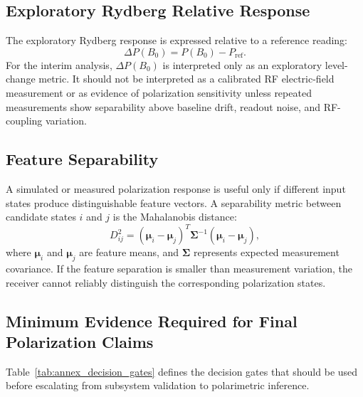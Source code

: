 \documentclass{ieeeaccess}
\begin{document}
\subsection{Exploratory Rydberg Relative Response}
\label{annex:rydberg_relative_response}

The exploratory Rydberg response is expressed relative to a reference reading:
\begin{equation}
\Delta P(B_0)
=
P(B_0)-P_{\mathrm{ref}}.
\label{eq:annex_relative_delta_p}
\end{equation}
For the interim analysis, \(\Delta P(B_0)\) is interpreted only as an exploratory level-change metric. It should not be interpreted as a calibrated RF electric-field measurement or as evidence of polarization sensitivity unless repeated measurements show separability above baseline drift, readout noise, and RF-coupling variation.

\subsection{Feature Separability}
\label{annex:feature_separability}

A simulated or measured polarization response is useful only if different input states produce distinguishable feature vectors. A separability metric between candidate states \(i\) and \(j\) is the Mahalanobis distance:
\begin{equation}
D_{ij}^{2}
=
(\boldsymbol{\mu}_{i}-\boldsymbol{\mu}_{j})^{T}
\mathbf{\Sigma}^{-1}
(\boldsymbol{\mu}_{i}-\boldsymbol{\mu}_{j}),
\label{eq:annex_mahalanobis}
\end{equation}
where \(\boldsymbol{\mu}_{i}\) and \(\boldsymbol{\mu}_{j}\) are feature means, and \(\mathbf{\Sigma}\) represents expected measurement covariance. If the feature separation is smaller than measurement variation, the receiver cannot reliably distinguish the corresponding polarization states.

\subsection{Minimum Evidence Required for Final Polarization Claims}
\label{annex:claim_gates}

Table~\ref{tab:annex_decision_gates} defines the decision gates that should be used before escalating from subsystem validation to polarimetric inference.
\end{document}
